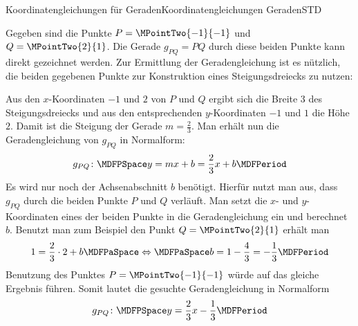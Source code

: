 \begin{MXContent}{Koordinatengleichungen für Geraden}{Koordinatengleichungen Geraden}{STD}
\begin{MExample}
Gegeben sind die Punkte $P=\MPointTwo{-1}{-1}$ und $Q=\MPointTwo{2}{1}$. Die Gerade $g_{P Q}=P Q$ durch diese beiden Punkte kann direkt gezeichnet werden. Zur Ermittlung der Geradengleichung ist es nützlich, die beiden gegebenen Punkte zur Konstruktion eines Steigungsdreiecks zu nutzen: 
  \begin{center}
\end{center} 

Aus den $x$-Koordinaten $-1$ und $2$ von $P$ und $Q$ ergibt sich die Breite $3$ des Steigungsdreiecks und aus den entsprechenden $y$-Koordinaten $-1$ und $1$ die Höhe $2$. Damit ist die Steigung der Gerade $m=\frac{2}{3}$. Man erhält nun die Geradengleichung von $g_{P Q}$ in Normalform: 
\[
 g_{P Q}\colon\MDFPSpace y=m x+b=\frac{2}{3}x+b\MDFPeriod
\]
Es wird nur noch der Achsenabschnitt $b$ benötigt. Hierfür nutzt man aus, dass $g_{P Q}$ durch die beiden Punkte $P$ und $Q$ verläuft. Man setzt die $x$- und $y$-Koordinaten eines der beiden Punkte in die Geradengleichung ein und berechnet $b$. Benutzt man zum Beispiel den Punkt $Q=\MPointTwo{2}{1}$ erhält man
\[
 1=\frac{2}{3}\cdot 2 + b\MDFPaSpace\Leftrightarrow\MDFPaSpace b=1-\frac{4}{3}=-\frac{1}{3}\MDFPeriod
\]
Benutzung des Punktes $P=\MPointTwo{-1}{-1}$ würde auf das gleiche Ergebnis führen. Somit lautet die gesuchte Geradengleichung in Normalform
\[
 g_{P Q}\colon\MDFPSpace y=\frac{2}{3}x-\frac{1}{3}\MDFPeriod
\]
\end{MExample}


\end{MXContent}
